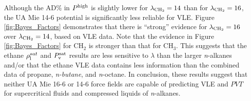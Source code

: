 \documentclass[preprint,letterpaper,floatfix,citeautoscript,aip,jcp]{revtex4-1}
\begin{document}
Although the AD\% in $P^{\rm high}$ is slightly lower for $\lambda_{\rm CH_2} = 14$ than for $\lambda_{\rm CH_2} = 16$, the UA Mie 14-6 potential is significantly less reliable for VLE. Figure \ref{fig:Bayes_Factors} demonstrates that there is ``strong'' evidence for $\lambda_{\rm CH_2} = 16$ over $\lambda_{\rm CH_2} = 14$, based on VLE data. 
Note that the evidence in Figure \ref{fig:Bayes_Factors} for CH$_2$ is stronger than that for CH$_3$. This suggests that the ethane $\rho_{\rm l}^{sat}$ and $P_{\rm v}^{\rm sat}$ results are less sensitive to $\lambda$ than the larger \textit{n}-alkanes and/or that the ethane VLE data contains less information than the combined data of propane, \textit{n-butane}, and \textit{n}-octane.
In conclusion, these results suggest that neither UA Mie 16-6 or 14-6 force fields are capable of predicting VLE and $PVT$ for supercritical fluids and compressed liquids of \textit{n}-alkanes. 




\end{document}
